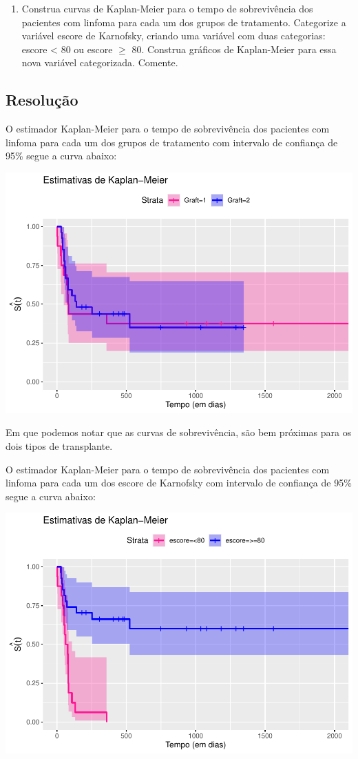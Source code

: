 \documentclass[]{article}
\providecommand{\tightlist}{%
  \setlength{\itemsep}{0pt}\setlength{\parskip}{0pt}}
\begin{document}
\begin{enumerate}
\def\labelenumi{(\alph{enumi})}
\tightlist
\item
  Construa curvas de Kaplan-Meier para o tempo de sobrevivência dos
  pacientes com linfoma para cada um dos grupos de tratamento.
  Categorize a variável escore de Karnofsky, criando uma variável com
  duas categorias: escore \textless{} 80 ou escore \(\geq\) 80. Construa
  gráficos de Kaplan-Meier para essa nova variável categorizada.
  Comente.
\end{enumerate}

\subsection{Resolução}\label{resolucao-5}

O estimador Kaplan-Meier para o tempo de sobrevivência dos pacientes com
linfoma para cada um dos grupos de tratamento com intervalo de confiança
de 95\% segue a curva abaixo:

\begin{center}\includegraphics[width=0.8\linewidth]{Lista_3_files/figure-latex/unnamed-chunk-5-1} \end{center}

Em que podemos notar que as curvas de sobrevivência, são bem próximas
para os dois tipos de transplante.

O estimador Kaplan-Meier para o tempo de sobrevivência dos pacientes com
linfoma para cada um dos escore de Karnofsky com intervalo de confiança
de 95\% segue a curva abaixo:

\begin{center}\includegraphics[width=0.8\linewidth]{Lista_3_files/figure-latex/unnamed-chunk-6-1} \end{center}
\end{document}
